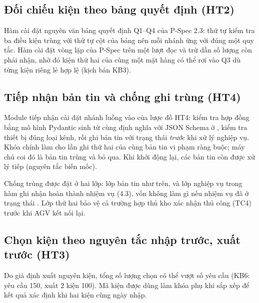 \subsection{Đối chiếu kiện theo bảng quyết định (HT2)}

Hàm  cài đặt nguyên văn bảng quyết định Q1--Q4 của P-Spec 2.3: thứ tự kiểm tra ba điều kiện trùng với thứ tự cột của bảng nên mỗi nhánh  ứng với đúng một quy tắc. Hàm  cài đặt vòng lặp của P-Spec trên một lượt đọc và trừ dần số lượng còn phải nhận, nhờ đó kiện thứ hai của cùng một mặt hàng có thể rơi vào Q3 dù từng kiện riêng lẻ hợp lệ (kịch bản KB3).


\subsection{Tiếp nhận bản tin và chống ghi trùng (HT4)}

Module tiếp nhận cài đặt nhánh luồng vào của lược đồ HT4: kiểm tra hợp đồng bằng mô hình Pydantic sinh từ cùng định nghĩa với JSON Schema ở , kiểm tra thiết bị đúng loại kênh, rồi ghi bản tin với trạng thái  \emph{trước} khi xử lý nghiệp vụ. Khóa chính  làm cho lần ghi thứ hai của cùng bản tin vi phạm ràng buộc; máy chủ coi đó là bản tin trùng và bỏ qua. Khi khởi động lại, các bản tin còn  được xử lý tiếp (nguyên tắc biến mốc).


Chống trùng được đặt ở hai lớp: lớp bản tin như trên, và lớp nghiệp vụ trong hàm ghi nhận hoàn thành nhiệm vụ (4.3), vốn không làm gì nếu nhiệm vụ đã ở trạng thái . Lớp thứ hai bảo vệ cả trường hợp thủ kho xác nhận thủ công (TC4) trước khi AGV kết nối lại.

\subsection{Chọn kiện theo nguyên tắc nhập trước, xuất trước (HT3)}


Do giả định xuất nguyên kiện, tổng số lượng chọn có thể vượt số yêu cầu (KB6: yêu cầu 150, xuất 2 kiện 100). Mã kiện được dùng làm khóa phụ khi sắp xếp để kết quả xác định khi hai kiện cùng ngày nhập.

